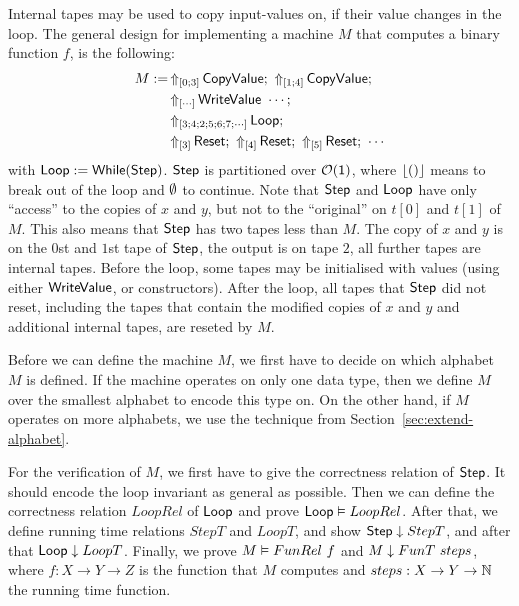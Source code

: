 Internal tapes may be used to copy input-values on, if their value changes in the loop.  The general design for implementing a machine $M$ that
computes a binary function $f$, is the following:
\begin{align*}
  M := & \LiftTapes{\MS{CopyValue}}{\Vector{0; 3}} \Seq \LiftTapes{\MS{CopyValue}}{\Vector{1; 4}} \Seq \\
       & \LiftTapes{\MS{WriteValue}~\cdots}{\Vector{\cdots}} \Seq \\
       & \LiftTapes{\MS{Loop}}{\Vector{3; 4; 2; 5; 6; 7; \cdots}} \Seq \\
       & \LiftTapes{\MS{Reset}}{\Vector{3}} \Seq \LiftTapes{\MS{Reset}}{\Vector{4}} \Seq \LiftTapes{\MS{Reset}}{\Vector{5}} \Seq \cdots
\end{align*}
with $\mathsf{Loop} := \mathsf{While}(\mathsf{Step})$.  $\mathsf{Step}$ is partitioned over $\mathcal{O}(\mathsf{1})$, where $\left\lfloor {\ensuremath{\mathsf{()}}} \right\rfloor$ means to break out of the loop and
$\emptyset$ to continue.  Note that $\mathsf{Step}$ and $\mathsf{Loop}$ have only ``access'' to the copies of $x$ and $y$, but not to the ``original'' on $t[0]$
and $t[1]$ of $M$.  This also means that $\mathsf{Step}$ has two tapes less than $M$.  The copy of $x$ and $y$ is on the $0$st and $1$st tape of
$\mathsf{Step}$, the output is on tape $2$, all further tapes are internal tapes.  Before the loop, some tapes may be initialised with values (using
either $\mathsf{WriteValue}$, or constructors).  After the loop, all tapes that $\mathsf{Step}$ did not reset, including the tapes that contain the modified
copies of $x$ and $y$ and additional internal tapes, are reseted by $M$.

Before we can define the machine $M$, we first have to decide on which alphabet $M$ is defined.  If the machine operates on only one data type, then
we define $M$ over the smallest alphabet to encode this type on.  On the other hand, if $M$ operates on more alphabets, we use the technique from
Section~\ref{sec:extend-alphabet}.

For the verification of $M$, we first have to give the correctness relation of $\mathsf{Step}$.  It should encode the loop invariant as general as
possible.  Then we can define the correctness relation $LoopRel$ of $\mathsf{Loop}$ and prove $\mathsf{Loop} \mathrel{\vDash} LoopRel$.  After that, we define running
time relations $StepT$ and $LoopT$, and show $\mathsf{Step} \mathrel{\downarrow} StepT$, and after that $\mathsf{Loop} \mathrel{\downarrow} LoopT$.  Finally, we prove
$M \mathrel{\vDash} FunRel~f$ and $M \mathrel{\downarrow} FunT~steps$, where $f:X \to Y \to Z$ is the function that $M$ computes and $steps:X \rightarrow Y \rightarrow \mathbb{N}$ the
running time function.


